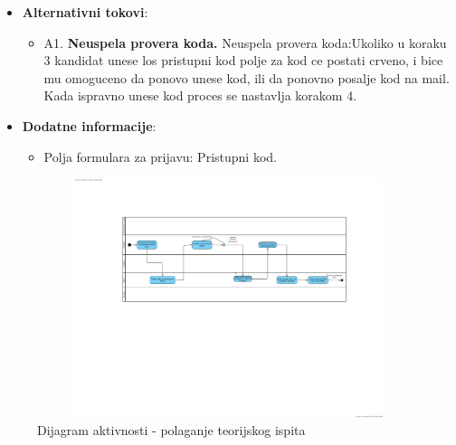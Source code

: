 \begin{itemize}
  \item \textbf{Alternativni tokovi}:
      \begin{itemize}
        \item A1. \textbf{Neuspela provera koda.}
        Neuspela provera koda:Ukoliko u koraku 3 kandidat unese los pristupni kod polje za kod ce postati crveno, i bice mu omoguceno da ponovo unese kod, ili da ponovno posalje kod na mail. Kada ispravno unese kod proces se nastavlja korakom 4.
      \end{itemize}
      
  \item \textbf{Dodatne informacije}:
      \begin{itemize}
        \item Polja formulara za prijavu: Pristupni kod. 
      \end{itemize}
\end{itemize}

\begin{figure}[H]
  \begin{center}
      \includegraphics[width=140mm, height=70mm]{Diagrams/polaganje teorijskog ispita.png}
  \end{center}
  \caption {Dijagram aktivnosti - polaganje teorijskog ispita}
  \label{activity_polaganje_teorije}

\end{figure}
